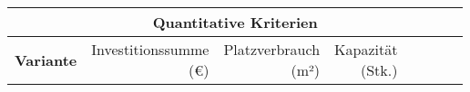 \newcommand{\naun}[1]{\textbf{\rotatebox{90}{\makecell[l]{#1}}}}

\renewcommand{\footnotesize}{\tiny}



\pagestyle{empty}

\begin{landscape}
  \begin{table}
    \centering
    \begin{tabular}{p{}rrrrrrr}
      \multicolumn{8}{c}{\textbf{Quantitative Kriterien}}                                                                                                                                                                                                                                                                                                                                                         \\
      \toprule
      \large\textbf{Variante}                            &
      \naun{Investitionssumme                                                                                                                                                                                                                                                                                                                                                                                     \\(\euro)}             &
      \naun{Platzverbrauch                                                                                                                                                                                                                                                                                                                                                                                        \\(m²)}               &
      \naun{Kapazität                                                                                                                                                                                                                                                                                                                                                                                             \\(Stk.)}            &

\end{tabular}
\end{table}
\end{landscape}
